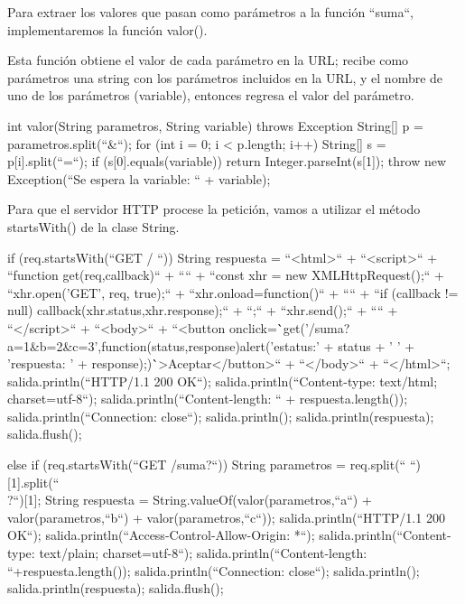 Para extraer los valores que pasan como parámetros a la función ``suma``, implementaremos la función valor().

Esta función obtiene el valor de cada parámetro en la URL; recibe como parámetros una string con los parámetros incluidos en la URL, y el nombre de uno de los parámetros (variable), entonces regresa el valor del parámetro.

\begin{SourceCode}
int valor(String parametros, String variable) throws Exception
{
  String[] p = parametros.split(``&``);
  for (int i = 0; i < p.length; i++)
  {
    String[] s = p[i].split(``=``);
    if (s[0].equals(variable))
      return Integer.parseInt(s[1]);
  }
  throw new Exception(``Se espera la variable: `` + variable);
}
\end{SourceCode}

Para que el servidor HTTP procese la petición, vamos a utilizar el método startsWith() de la clase String.

\begin{SourceCode}
if (req.startsWith(``GET / ``))
{
  String respuesta =
    ``<html>`` +
    ``<script>`` +
    ``function get(req,callback)`` +
    ``{`` +
    ``const xhr = new XMLHttpRequest();`` +
    ``xhr.open('GET', req, true);`` +
    ``xhr.onload=function()`` +
    ``{`` +
    ``if (callback != null) callback(xhr.status,xhr.response);`` +
    ``};`` +
    ``xhr.send();`` +
    ``}`` +
    ``</script>`` +
    ``<body>`` +
    ``<button onclick=\``get('/suma?a=1&b=2&c=3',function(status,response){alert('estatus:' + status + ' ' + 'respuesta: ' + response);})\``>Aceptar</button>`` +
    ``</body>`` +
    ``</html>``;
  salida.println(``HTTP/1.1 200 OK``);
  salida.println(``Content-type: text/html; charset=utf-8``);
  salida.println(``Content-length: `` + respuesta.length());
  salida.println(``Connection: close``);
  salida.println();
  salida.println(respuesta);
  salida.flush();
}
\end{SourceCode}

\begin{SourceCode}
else
if (req.startsWith(``GET /suma?``))
{
  String parametros = req.split(`` ``)[1].split(``\\?``)[1];
  String respuesta = String.valueOf(valor(parametros,``a``) + valor(parametros,``b``) +
                                                               valor(parametros,``c``));
  salida.println(``HTTP/1.1 200 OK``);
  salida.println(``Access-Control-Allow-Origin: *``);
  salida.println(``Content-type: text/plain; charset=utf-8``);
  salida.println(``Content-length: ``+respuesta.length());
  salida.println(``Connection: close``);
  salida.println();
  salida.println(respuesta);
  salida.flush();
}
 
\end{SourceCode}

